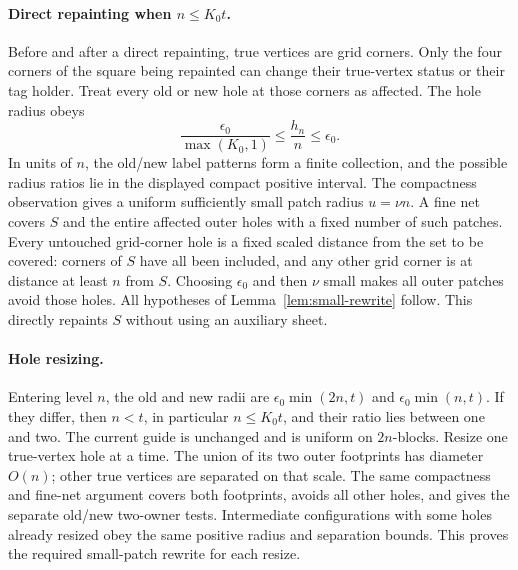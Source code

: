 \paragraph{Direct repainting when $n\le K_0t$.}
Before and after a direct repainting, true vertices are grid corners.
Only the four corners of the square being repainted can change their
true-vertex status or their tag holder.  Treat every old or new hole
at those corners as affected.  The hole radius obeys
\begin{equation}
 \frac{\epsilon_0}{\max(K_0,1)}
 \le \frac{h_n}{n}\le\epsilon_0.
 \label{eq:geometry-small-radius}
\end{equation}
In units of $n$, the old/new label patterns form a finite collection,
and the possible radius ratios lie in the displayed compact positive
interval.  The compactness observation gives a uniform sufficiently
small patch radius $u=\nu n$.  A fine net covers $S$ and the entire
affected outer holes with a fixed number of such patches.  Every
untouched grid-corner hole is a fixed scaled distance from the set to
be covered: corners of $S$ have all been included, and any other grid
corner is at distance at least $n$ from $S$.  Choosing $\epsilon_0$
and then $\nu$ small makes all outer patches avoid those holes.  All
hypotheses of Lemma~\ref{lem:small-rewrite} follow.  This
directly repaints $S$ without using an auxiliary sheet.

\paragraph{Hole resizing.}
Entering level $n$, the old and new radii are
$\epsilon_0\min(2n,t)$ and $\epsilon_0\min(n,t)$.  If they differ,
then $n<t$, in particular $n\le K_0t$, and their ratio lies between
one and two.  The current guide is unchanged and is uniform on
$2n$-blocks.  Resize one true-vertex hole at a time.  The union of
its two outer footprints has diameter $O(n)$; other true vertices
are separated on that scale.  The same compactness and fine-net
argument covers both footprints, avoids all other holes, and gives
the separate old/new two-owner tests.  Intermediate configurations
with some holes already resized obey the same positive radius and
separation bounds.  This proves the required small-patch rewrite for
each resize.

